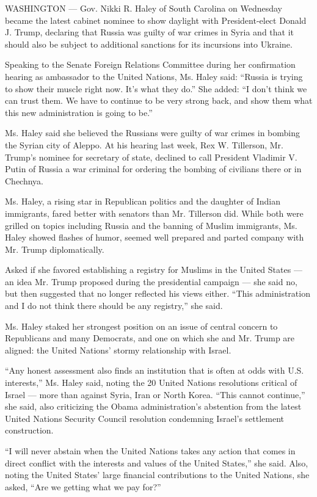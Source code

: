 WASHINGTON --- Gov. Nikki R. Haley of South Carolina on Wednesday became
the latest cabinet nominee to show daylight with President-elect Donald
J. Trump, declaring that Russia was guilty of war crimes in Syria and
that it should also be subject to additional sanctions for its
incursions into Ukraine.

Speaking to the Senate Foreign Relations Committee during her
confirmation hearing as ambassador to the United Nations, Ms. Haley
said: ``Russia is trying to show their muscle right now. It's what they
do.'' She added: ``I don't think we can trust them. We have to continue
to be very strong back, and show them what this new administration is
going to be.''

Ms. Haley said she believed the Russians were guilty of war crimes in
bombing the Syrian city of Aleppo. At his hearing last week, Rex W.
Tillerson, Mr. Trump's nominee for secretary of state, declined to call
President Vladimir V. Putin of Russia a war criminal for ordering the
bombing of civilians there or in Chechnya.

Ms. Haley, a rising star in Republican politics and the daughter of
Indian immigrants, fared better with senators than Mr. Tillerson did.
While both were grilled on topics including Russia and the banning of
Muslim immigrants, Ms. Haley showed flashes of humor, seemed well
prepared and parted company with Mr. Trump diplomatically.

Asked if she favored establishing a registry for Muslims in the United
States --- an idea Mr. Trump proposed during the presidential campaign
--- she said no, but then suggested that no longer reflected his views
either. ``This administration and I do not think there should be any
registry,'' she said.

Ms. Haley staked her strongest position on an issue of central concern
to Republicans and many Democrats, and one on which she and Mr. Trump
are aligned: the United Nations' stormy relationship with Israel.

``Any honest assessment also finds an institution that is often at odds
with U.S. interests,'' Ms. Haley said, noting the 20 United Nations
resolutions critical of Israel --- more than against Syria, Iran or
North Korea. ``This cannot continue,'' she said, also criticizing the
Obama administration's abstention from the latest United Nations
Security Council resolution condemning Israel's settlement construction.

``I will never abstain when the United Nations takes any action that
comes in direct conflict with the interests and values of the United
States,'' she said. Also, noting the United States' large financial
contributions to the United Nations, she asked, ``Are we getting what we
pay for?''

